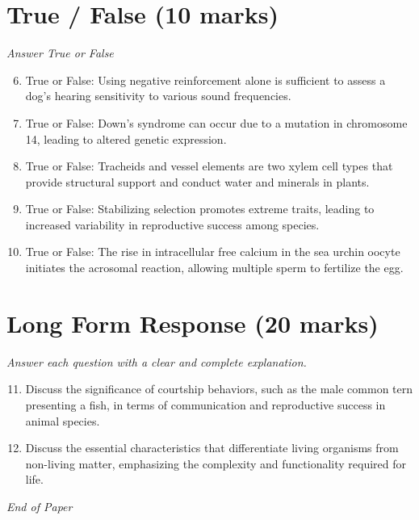 \documentclass[12pt]{article}
\begin{document}
\section*{True / False (10 marks)}
\textit{Answer True or False}
\begin{enumerate}[label=\arabic*.]
\setcounter{enumi}{5}
\item True or False: Using negative reinforcement alone is sufficient to assess a dog's hearing sensitivity to various sound frequencies.
\item True or False: Down's syndrome can occur due to a mutation in chromosome 14, leading to altered genetic expression.
\item True or False: Tracheids and vessel elements are two xylem cell types that provide structural support and conduct water and minerals in plants.
\item True or False: Stabilizing selection promotes extreme traits, leading to increased variability in reproductive success among species.
\item True or False: The rise in intracellular free calcium in the sea urchin oocyte initiates the acrosomal reaction, allowing multiple sperm to fertilize the egg.
\end{enumerate}

\section*{Long Form Response (20 marks)}
\textit{Answer each question with a clear and complete explanation.}
\begin{enumerate}[label=\arabic*.]
\setcounter{enumi}{10}
\item Discuss the significance of courtship behaviors, such as the male common tern presenting a fish, in terms of communication and reproductive success in animal species.
\item Discuss the essential characteristics that differentiate living organisms from non-living matter, emphasizing the complexity and functionality required for life.
\end{enumerate}

\vfill
\noindent\textit{End of Paper}
\end{document}
